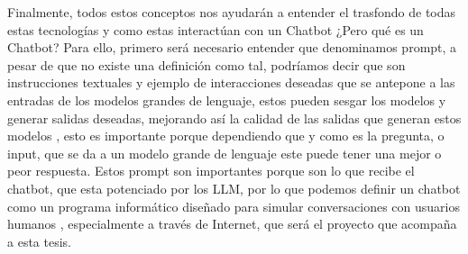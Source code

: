 Finalmente, todos estos conceptos nos ayudarán a entender el trasfondo de todas estas tecnologías y como estas interactúan 
con un Chatbot ¿Pero qué es un Chatbot? Para ello, primero será necesario entender que denominamos prompt, a pesar de que 
no existe una definición como tal, podríamos decir que son instrucciones textuales y ejemplo de interacciones deseadas 
que se antepone a las entradas de los modelos grandes de lenguaje, estos pueden sesgar los modelos y generar salidas 
deseadas, mejorando así la calidad de las salidas que generan estos modelos \cite{prompt}, esto es importante porque dependiendo 
que y como es la pregunta, o input, que se da a un modelo grande de lenguaje este puede tener una mejor o peor respuesta. 
Estos prompt son importantes porque son lo que recibe el chatbot, que esta potenciado por los LLM, por lo que podemos 
definir un chatbot como un programa informático diseñado para simular conversaciones con usuarios humanos \cite{chatbot_def}, especialmente 
a través de Internet, que será el proyecto que acompaña a esta tesis. 

